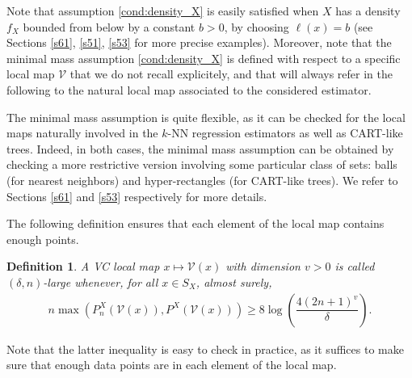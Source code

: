 \documentclass[paper=a4, fontsize=11pt]{scrartcl}
\newtheorem{definition}[theorem]{Definition}
\begin{document}
Note that assumption \ref{cond:density_X} is easily satisfied when $X$ has a density $f_X$ bounded from below by a constant $b > 0$, by choosing $\ell(x) = b$ (see Sections \ref{s61}, \ref{s51}, \ref{s53} for more precise examples).
Moreover, note that the minimal mass assumption \ref{cond:density_X} is defined with respect to a specific local map $\mathcal{V}$ that we do not recall explicitely, and that will always refer in the following to the natural local map associated to the considered estimator. 

The minimal mass assumption is quite flexible, as it can be checked for the local maps naturally involved in the $k$-NN regression estimators as well as CART-like trees. Indeed, in both cases, the  minimal mass assumption can be obtained by checking a more restrictive version involving some particular class of sets: balls (for nearest neighbors) and hyper-rectangles (for CART-like trees). We refer to Sections \ref{s61} and \ref{s53} respectively for more details.  %

The following definition ensures that each element of the local map contains enough points. 

\begin{definition}
A VC local map  $x\mapsto  \mathcal V(x)$ with dimension $v>0$ is called $(\delta, n)$-large whenever, for all $x\in S_X$, almost surely,
    \begin{align*}
  n \max (P_n^X (\mathcal V(x))  ,     P^X(\mathcal V(x)) )  \geq 8 \log\left(\dfrac{4 (2n+1) ^v }{\delta} \right).
\end{align*}
\end{definition}

Note that the latter inequality is easy to check in practice, as it suffices to make sure that enough data points are in each element of the local map.
\end{document}

